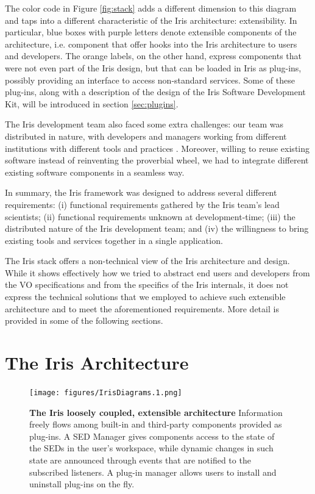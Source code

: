 \documentclass[final,5p]{elsarticle}
\begin{document}
The color code in Figure \ref{fig:stack} adds a different dimension to this diagram and taps into a different characteristic of the Iris architecture: extensibility. In particular, blue boxes with purple letters denote extensible components of the architecture, i.e. component that offer hooks into the Iris architecture to users and developers. The orange labels, on the other hand, express components that were not even part of the Iris design, but that can be loaded in Iris as plug-ins, possibly providing an interface to access non-standard services. Some of these plug-ins, along with a description of the design of the Iris Software Development Kit, will be introduced in section \ref{sec:plugins}.

The Iris development team also faced some extra challenges: our team was distributed in nature, with developers and managers working from different institutions with different tools and practices \citep{2012SPIE.8449E..0IE}. Moreover, willing to reuse existing software instead of reinventing the proverbial wheel, we had to integrate different existing software components in a seamless way.

In summary, the Iris framework was designed to address several different requirements: (i) functional requirements gathered by the Iris team's lead scientists; (ii) functional requirements unknown at development-time; (iii) the distributed nature of the Iris development team; and (iv) the willingness to bring existing tools and services together in a single application.

The Iris stack offers a non-technical view of the Iris architecture and design. While it shows effectively how we tried to abstract end users and developers from the VO specifications and from the specifics of the Iris internals, it does not express the technical solutions that we employed to achieve such extensible architecture and to meet the aforementioned requirements. More detail is provided in some of the following sections.



\section{The Iris Architecture}
\label{sec:architecture}

\begin{figure}
\begin{center}
\texttt{[image: figures/IrisDiagrams.1.png]}
\caption{\textbf{The Iris loosely coupled, extensible architecture} Information freely flows among built-in and third-party components provided as plug-ins. A SED Manager gives components access to the state of the SEDs in the user's workspace, while dynamic changes in such state are announced through events that are notified to the subscribed listeners. A plug-in manager allows users to install and uninstall plug-ins on the fly.}
\label{fig:architecture}
\end{center}
\end{figure}
\end{document}

